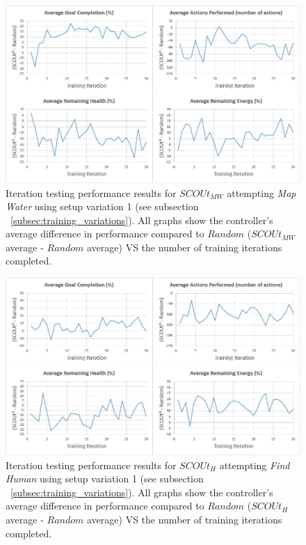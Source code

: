 \begin{figure}[H]
  \includegraphics[width=1.0\columnwidth]{Figures/Results/TrainingVariation1/MapWater.JPG}
  \caption{Iteration testing performance results for $SCOUt_{MW}$ attempting \textit{Map Water} using setup variation 1 (see subsection ~\ref{subsec:training_variations}). All graphs show the controller's average difference in performance compared to $Random$ ($SCOUt_{MW}$ average - $Random$ average) VS the number of training iterations completed.}
  \label{fig:mapwater_training_variation1}
\end{figure}

\begin{figure}[H]
  \includegraphics[width=1.0\columnwidth]{Figures/Results/TrainingVariation1/Hybrid-FindHuman.JPG}
  \caption{Iteration testing performance results for $SCOUt_{H}$ attempting \textit{Find Human} using setup variation 1 (see subsection ~\ref{subsec:training_variations}). All graphs show the controller's average difference in performance compared to $Random$ ($SCOUt_{H}$ average - $Random$ average) VS the number of training iterations completed.}
  \label{fig:hybrid_training_fh_variation1}
\end{figure}

